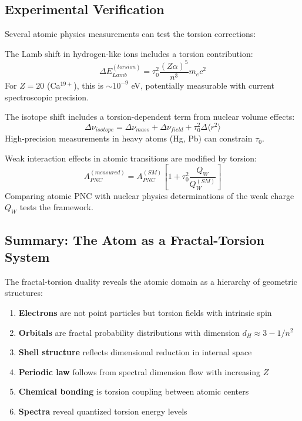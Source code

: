 \subsection{Experimental Verification}

Several atomic physics measurements can test the torsion corrections:

\begin{test}
The Lamb shift in hydrogen-like ions includes a torsion contribution:
\begin{equation}
    \Delta E_{Lamb}^{(torsion)} = \tau_0^2 \frac{(Z\alpha)^5}{n^3} m_e c^2
\end{equation}
For $Z = 20$ (Ca$^{19+}$), this is $\sim 10^{-9}$ eV, potentially measurable with current spectroscopic precision.
\end{test}

\begin{test}
The isotope shift includes a torsion-dependent term from nuclear volume effects:
\begin{equation}
    \Delta \nu_{isotope} = \Delta \nu_{mass} + \Delta \nu_{field} + \tau_0^2 \Delta \langle r^2 \rangle
\end{equation}
High-precision measurements in heavy atoms (Hg, Pb) can constrain $\tau_0$.
\end{test}

\begin{test}
Weak interaction effects in atomic transitions are modified by torsion:
\begin{equation}
    A_{PNC}^{(measured)} = A_{PNC}^{(SM)} \left[1 + \tau_0^2 \frac{Q_W}{Q_W^{(SM)}}\right]
\end{equation}
Comparing atomic PNC with nuclear physics determinations of the weak charge $Q_W$ tests the framework.
\end{test}

\subsection{Summary: The Atom as a Fractal-Torsion System}

The fractal-torsion duality reveals the atomic domain as a hierarchy of geometric structures:

\begin{enumerate}
    \item \textbf{Electrons} are not point particles but torsion fields with intrinsic spin
    \item \textbf{Orbitals} are fractal probability distributions with dimension $d_H \approx 3 - 1/n^2$
    \item \textbf{Shell structure} reflects dimensional reduction in internal space
    \item \textbf{Periodic law} follows from spectral dimension flow with increasing $Z$
    \item \textbf{Chemical bonding} is torsion coupling between atomic centers
    \item \textbf{Spectra} reveal quantized torsion energy levels
\end{enumerate}

